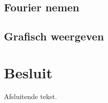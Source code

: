 \documentclass[a4paper,kul]{kulakarticle} %
\begin{document}
\subsection{Fourier nemen}

\subsection{Grafisch weergeven}

\section{Besluit}

Afsluitende tekst.
\end{document}
